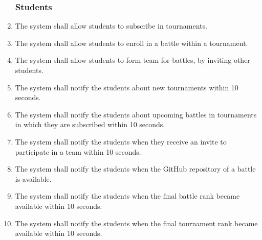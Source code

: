 \begin{enumerate}[label=\textbf{R.\arabic*}]
            \subsubsection*{Students}
            \item {} {The system shall allow students to subscribe in tournaments.}
            \item {} {The system shall allow students to enroll in a battle within a tournament.}
            \item {} {The system shall allow students to form team for battles, by inviting other students.}        
            \item {} {The system shall notify the students about new tournaments within 10 seconds.}
            \item {} {The system shall notify the students about upcoming battles in tournaments in which they are subscribed within 10 seconds.}
             \item {} {The system shall notify the students when they receive an invite to participate in a team within 10 seconds.}
             \item {} {The system shall notify the students when the GitHub repository of a battle is available.}
             \item {} {The system shall notify the students when the final battle rank became available within 10 seconds.}
             \item {} {The system shall notify the students when the final tournament rank became available within 10 seconds.}
        \end{enumerate}

